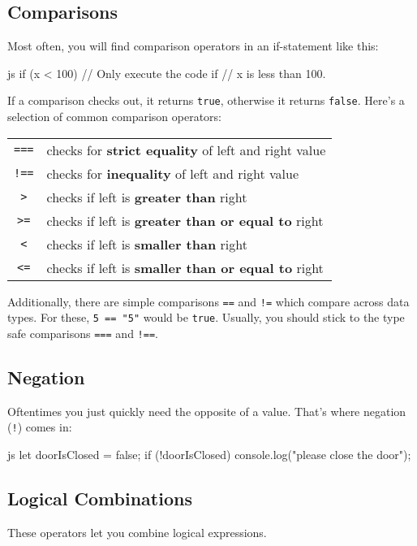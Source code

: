 \documentclass[10pt,a4paper]{article}
\begin{document}
\begin{multicols}{3}
\subsection*{Comparisons}
Most often, you will find comparison operators in an if-statement like this:

\begin{codebox}{js}{}
  if (x < 100) {
    // Only execute the code if
    // x is less than 100.
  }
\end{codebox}
If a comparison checks out, it returns \texttt{true}, otherwise it returns \texttt{false}. Here's a selection of common comparison operators:

\vspace{0.5cm}
\begin{tabular}{c l}
  \texttt{===} & checks for \textbf{strict equality} of left and right value \\
  \texttt{!==} & checks for \textbf{inequality} of left and right value \\
  \texttt{>} & checks if left is \textbf{greater than} right \\
  \texttt{>=} & checks if left is \textbf{greater than or equal to} right \\
  \texttt{<} & checks if left is \textbf{smaller than} right \\
  \texttt{<=} & checks if left is \textbf{smaller than or equal to} right \\
\end{tabular}

Additionally, there are simple comparisons \texttt{==} and \texttt{!=} which compare across data types. For these, \texttt{5 == "5"} would be \texttt{true}. Usually, you should stick to the type safe comparisons \texttt{===} and \texttt{!==}.

\subsection*{Negation}
Oftentimes you just quickly need the opposite of a value. That's where negation (\texttt{!}) comes in:
\begin{codebox}{js}{}
  let doorIsClosed = false;
  if (!doorIsClosed) {
    console.log("please close the door");
  }
\end{codebox}

\subsection*{Logical Combinations}
These operators let you combine logical expressions.


\end{multicols}
\end{document}
